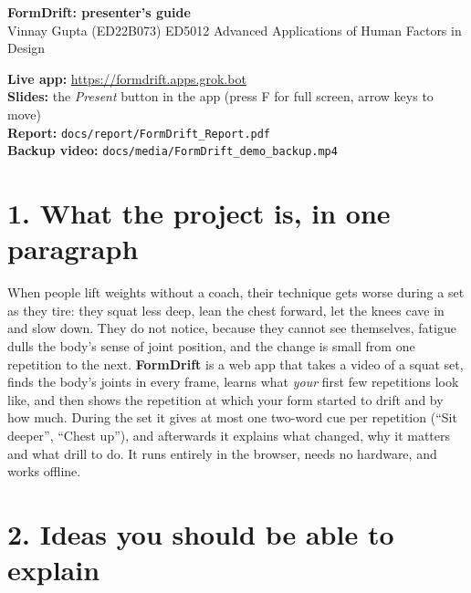 \documentclass[11pt]{article}
\newcommand{\key}[1]{\textcolor{keyred}{\textbf{#1}}}
\begin{document}
{\Large\textbf{FormDrift: presenter's guide}}\\[0.2em]
Vinnay Gupta (ED22B073) \quad ED5012 Advanced Applications of Human Factors in Design

\begin{mdframed}[style=note]
\textbf{Live app:} \url{https://formdrift.apps.grok.bot}\\
\textbf{Slides:} the \emph{Present} button in the app (press F for full screen, arrow keys to move)\\
\textbf{Report:} \texttt{docs/report/FormDrift\_Report.pdf}\\
\textbf{Backup video:} \texttt{docs/media/FormDrift\_demo\_backup.mp4}
\end{mdframed}

\section*{1. What the project is, in one paragraph}

When people lift weights without a coach, their technique gets worse during a set as they tire: they squat less deep, lean the chest forward, let the knees cave in and slow down. They do not notice, because they cannot see themselves, fatigue dulls the body's sense of joint position, and the change is small from one repetition to the next. \key{FormDrift} is a web app that takes a video of a squat set, finds the body's joints in every frame, learns what \emph{your} first few repetitions look like, and then shows the repetition at which your form started to drift and by how much. During the set it gives at most one two-word cue per repetition (``Sit deeper'', ``Chest up''), and afterwards it explains what changed, why it matters and what drill to do. It runs entirely in the browser, needs no hardware, and works offline.

\section*{2. Ideas you should be able to explain}
\end{document}
